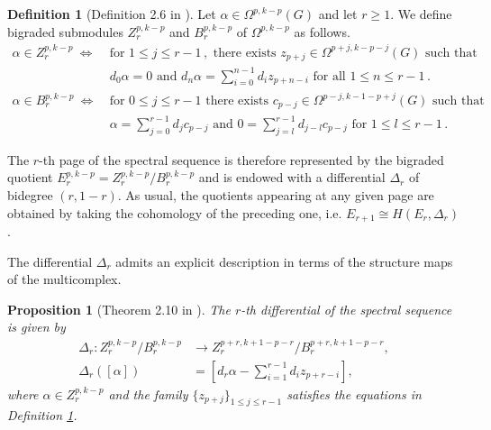 \documentclass[dvipsnames]{amsart}
\newtheorem{proposition}[theorem]{Proposition}
\theoremstyle{definition}
\newtheorem{definition}[theorem]{Definition}
\theoremstyle{definition}
\numberwithin{equation}{section}
\begin{document}
\begin{definition}[Definition 2.6 in \cite{livernet2020spectral}]\label{def: Z and B defined} Let $\alpha\in\Omega^{p,k-p}(G)$ and let $r\ge 1$. We define bigraded submodules $Z_r^{p,k-p}$ and $B_r^{p,k-p}$ of $\Omega^{p,k-p}$ as follows.
\begin{align*}
    \alpha\in Z_r^{p,k-p}\ \Longleftrightarrow&\ \text{for }1\le j\le r-1\,,\text{ there exists }z_{p+j}\in\Omega^{p+j,k-p-j}(G)\text{ such that}\\&\ d_0\alpha=0\text{ and }d_n\alpha=\sum_{i=0}^{n-1}d_iz_{p+n-i}\text{ for all }1\le n\le r-1\,.\\
    \alpha\in B_r^{p,k-p}\ \Longleftrightarrow&\ \text{for }0\le j\le r-1\text{ there exists }c_{p-j}\in\Omega^{p-j,k-1-p+j}(G)\text{ such that}\\&\ \alpha=\sum_{j=0}^{r-1}d_jc_{p-j}\text{ and }0=\sum_{j=l}^{r-1}d_{j-l}c_{p-j}\text{ for }1\le l\le r-1\,.
\end{align*}
\end{definition}

The $r$-th page of the spectral sequence is therefore represented by the bigraded quotient $E_r^{p,k-p} = Z_r^{p,k-p}/B_r^{p,k-p}$ and is endowed with a differential $\Delta_r$ of bidegree $(r,1-r)$. As usual, the quotients appearing at any given page are obtained by taking the cohomology of the preceding one, i.e. $E_{r+1}\cong H(E_r,\Delta_r)$. 

The differential $\Delta_r$ admits an explicit description in terms of the structure maps of the multicomplex. \begin{proposition}[Theorem 2.10 in \cite{livernet2020spectral}] \label{prop: Delta con diff} The $r$-th differential of the spectral sequence is given by \begin{align*} \Delta_r\colon Z_r^{p,k-p}/B_r^{p,k-p} &\longrightarrow Z_r^{p+r,k+1-p-r}/B_r^{p+r,k+1-p-r}, \\ \Delta_r([\alpha]) &= \left[ d_r\alpha - \sum_{i=1}^{r-1} d_i z_{p+r-i} \right], \end{align*} where $\alpha\in Z_r^{p,k-p}$ and the family $\{z_{p+j}\}_{1\leq j\leq r-1}$ satisfies the equations in Definition \ref{def: Z and B defined}. \end{proposition}
\end{document}
